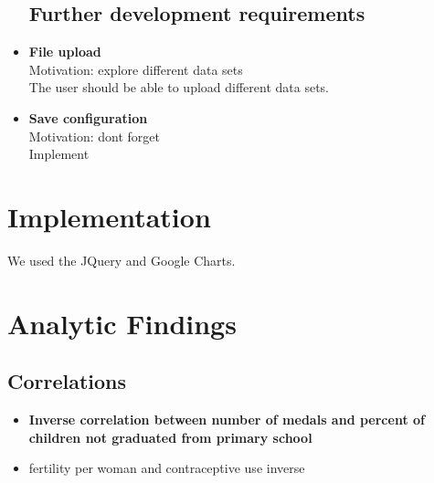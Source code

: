 \documentclass[a4paper]{article}
\begin{document}
\begin{itemize}
\subsection{Further development requirements}
\item{\textbf{File upload}\\Motivation: explore different data sets\\The user should be able to upload different data sets.}
\item{\textbf{Save configuration}\\Motivation: dont forget\\Implement}
\end{itemize}

\section{Implementation}
We used the JQuery and Google Charts.


\section{Analytic Findings}
\subsection{Correlations}
\begin{itemize}
\item{\textbf{Inverse correlation between number of medals and percent of children not graduated from primary school}}
\item{fertility per woman and contraceptive use inverse}
\end{itemize}
\end{document}
